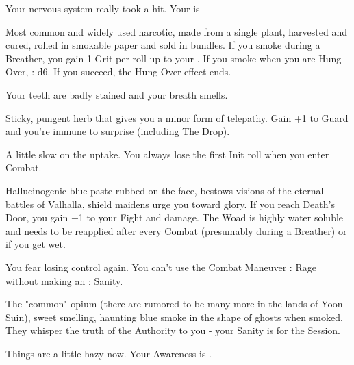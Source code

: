 {\begin{multicols}{2}
    Your nervous system really took a hit.  Your \MAX \DEX is \DCDOWN



  Most common and widely used narcotic, made from a single plant, harvested and cured, rolled in smokable paper and sold in bundles.  If you smoke during a Breather, you gain 1 Grit per roll up to your \MAX.  If you smoke when you are Hung Over, \RS : d6.  If you succeed, the Hung Over effect ends.

    Your teeth are badly stained and your breath smells.  


  Sticky, pungent herb that gives you a minor form of telepathy.  Gain +1 to Guard \RO  and you're immune to surprise (including The Drop).  

    A little slow on the uptake.  You always lose the first Init roll when you enter Combat.



  Hallucinogenic blue paste rubbed on the face, bestows visions of the eternal battles of Valhalla, shield maidens urge you toward glory.  If you reach Death's Door, you gain +1 to your Fight \RO and damage. The Woad is highly water soluble and needs to be reapplied after every Combat (presumably during a Breather) or if you get wet.

    You fear losing control again.  You can't use the Combat Maneuver : Rage without making an \RS : Sanity.


  The "common" opium (there are rumored to be many more in the lands of Yoon Suin), sweet smelling, haunting blue smoke in the shape of ghosts when smoked.  They whisper the truth of the Authority to you - your \MAX Sanity is \DCUP for the Session.

    Things are a little hazy now.  Your \MAX Awareness is \DCDOWN.




\end{multicols}}

